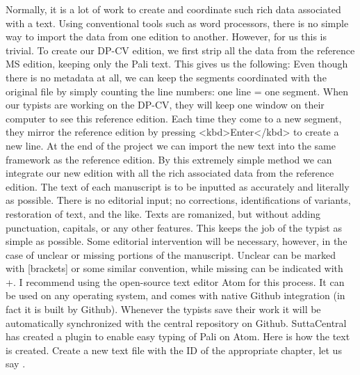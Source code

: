 {}Normally, it is a lot of work to create and coordinate such rich data associated with a text. Using conventional tools such as word processors, there is no simple way to import the data from one edition to another. However, for us this is trivial. To create our DP-CV edition, we first strip all the data from the reference MS edition, keeping only the Pali text. This gives us the following:\markdownRendererInterblockSeparator
{}\markdownRendererInterblockSeparator
{}Even though there is no metadata at all, we can keep the segments coordinated with the original file by simply counting the line numbers: one line = one segment.\markdownRendererInterblockSeparator
{}When our typists are working on the DP-CV, they will keep one window on their computer to see this reference edition. Each time they come to a new segment, they mirror the reference edition by pressing <kbd>Enter</kbd> to create a new line. At the end of the project we can import the new text into the same framework as the reference edition. By this extremely simple method we can integrate our new edition with all the rich associated data from the reference edition.\markdownRendererInterblockSeparator
{}\markdownRendererInterblockSeparator
{}The text of each manuscript is to be inputted as accurately and literally as possible. There is no editorial input; no corrections, identifications of variants, restoration of text, and the like. Texts are romanized, but without adding punctuation, capitals, or any other features. This keeps the job of the typist as simple as possible.\markdownRendererInterblockSeparator
{}Some editorial intervention will be necessary, however, in the case of unclear or missing portions of the manuscript. Unclear  can be marked with [brackets] or some similar convention, while missing  can be indicated with +.\markdownRendererInterblockSeparator
{}I recommend using the open-source text editor Atom for this process. It can be used on any operating system, and comes with native Github integration (in fact it is built by Github). Whenever the typists save their work it will be automatically synchronized with the central repository on Github. SuttaCentral has created a plugin to enable easy typing of Pali on Atom.\markdownRendererInterblockSeparator
{}Here is how the text is created.\markdownRendererInterblockSeparator
{}\markdownRendererOlBegin
{}Create a new text file with the ID of the appropriate chapter, let us say .\markdownRendererOlItemEnd 
